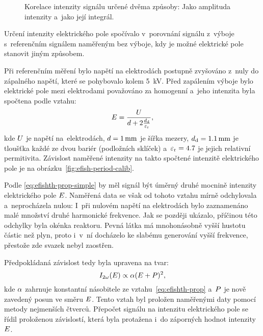 \begin{figure}[hbp]
	\centering
	
	\caption{Korelace intenzity signálu \EFISH{} určené dvěma způsoby:
		Jako amplituda intenzity a~jako její integrál.}
	\label{fig:efish-intmax}
\end{figure}

Určení intenzity elektrického pole spočívalo v~porovnání signálu
\EFISH{} z~výboje s~referenčním signálem naměřeným bez výboje,
kdy je možné elektrické pole stanovit jiným způsobem.

Při referenčním měření bylo napětí na elektrodách postupně zvyšováno
z~nuly do zápalného napětí, které se pohybovalo kolem \SI{5}{\kilo\volt}.
Před zapálením výboje bylo elektrické pole mezi elektrodami považováno
za homogenní a~jeho intenzita byla spočtena podle vztahu:
\begin{equation}
	E = \frac{U}
		{d + 2\frac{d_\text{d}}{\varepsilon_\text{r}}},
\end{equation}
kde $U$ je napětí na~elektrodách,
$d = \SI{1}{\milli\metre}$ je šířka mezery,
$d_\text{d} = \SI{1.1}{\milli\metre}$ je tloušťka každé ze dvou bariér
(podložních sklíček)
a~$\varepsilon_\text{r} = \num{4.7}$ je jejich relativní permitivita.
Závislost naměřené intenzity na takto spočtené intenzitě elektrického
pole je na obrázku~\ref{fig:efish-period-calib}.

Podle \eqref{eq:efishth-prop-simple} by měl signál \EFISH{} být úměrný
druhé mocnině intenzity elektrického pole $E$.
Naměřená data se však od tohoto vztahu mírně odchylovala a~neprocházela nulou:
I~při nulovém napětí na elektrodách bylo zaznamenáno malé množství
druhé harmonické frekvence.
Jak se později ukázalo, příčinou této odchylky byla okénka reaktoru.
Pevná látka má mnohonásobně vyšší hustotu částic než plyn,
proto i~v~ní docházelo ke slabému generování vyšší frekvence,
přestože zde svazek nebyl zaostřen.

Předpokládaná závislost tedy byla upravena na tvar:
\begin{equation}
	\label{eq:efish-prop}
	I_{2\omega}(E) \propto \alpha (E + P)^2,
\end{equation}
kde $\alpha$ zahrnuje konstantní násobitele
ze vztahu~\eqref{eq:efishth-prop}
a~$P$ je nově zavedený posun ve směru $E$.
Tento vztah byl proložen naměřenými daty pomocí metody nejmenších čtverců.
Přepočet signálu \EFISH{} na intenzitu elektrického pole se řídil
proloženou závislostí, která byla protažena i~do záporných hodnot
intenzity $E$.

